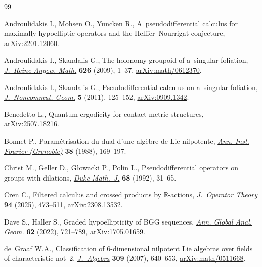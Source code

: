 \begin{thebibliography}{99}
\footnotesize\itemsep=0pt

Androulidakis I., Mohsen O., Yuncken R., A~pseudodifferential calculus for
 maximally hypoelliptic operators and the {H}elffer--{N}ourrigat conjecture,
 \href{https://arxiv.org/abs/2201.12060}{arXiv:2201.12060}.

Androulidakis I., Skandalis G., The holonomy groupoid of a~singular foliation,
 \href{https://doi.org/10.1515/CRELLE.2009.001}{\textit{J.~Reine Angew.
 Math.}} \textbf{626} (2009), 1--37,
 \href{https://arxiv.org/abs/math/0612370}{arXiv:math/0612370}.

Androulidakis I., Skandalis G., Pseudodifferential calculus on a~singular
 foliation, \href{https://doi.org/10.4171/JNCG/72}{\textit{J.~Noncommut.
 Geom.}} \textbf{5} (2011), 125--152,
 \href{https://arxiv.org/abs/0909.1342}{arXiv:0909.1342}.

Benedetto L., Quantum ergodicity for contact metric structures,
 \href{https://arxiv.org/abs/2507.18216}{arXiv:2507.18216}.

Bonnet P., Param\'etrisation du dual d'une alg\`ebre de {L}ie nilpotente,
 \href{https://doi.org/10.5802/aif.1144}{\textit{Ann. Inst. Fourier
 (Grenoble)}} \textbf{38} (1988), 169--197.

Christ M., Geller D., G{\l}owacki P., Polin L., Pseudodifferential operators on
 groups with dilations,
 \href{https://doi.org/10.1215/S0012-7094-92-06802-5}{\textit{Duke Math.~J.}}
 \textbf{68} (1992), 31--65.

Cren C., Filtered calculus and crossed products by {$\mathbb R$}-actions,
 \href{https://doi.org/10.7900/jot}{\textit{J.~Operator Theory}} \textbf{94}
 (2025), 473--511, \href{https://arxiv.org/abs/2308.13532}{arXiv:2308.13532}.

Dave S., Haller S., Graded hypoellipticity of {BGG} sequences,
 \href{https://doi.org/10.1007/s10455-022-09870-0}{\textit{Ann. Global Anal.
 Geom.}} \textbf{62} (2022), 721--789,
 \href{https://arxiv.org/abs/1705.01659}{arXiv:1705.01659}.

de~Graaf W.A., Classification of 6-dimensional nilpotent {L}ie algebras over
 fields of characteristic not~2,
 \href{https://doi.org/10.1016/j.jalgebra.2006.08.006}{\textit{J.~Algebra}}
 \textbf{309} (2007), 640--653,
 \href{https://arxiv.org/abs/math/0511668}{arXiv:math/0511668}.


\end{thebibliography}
